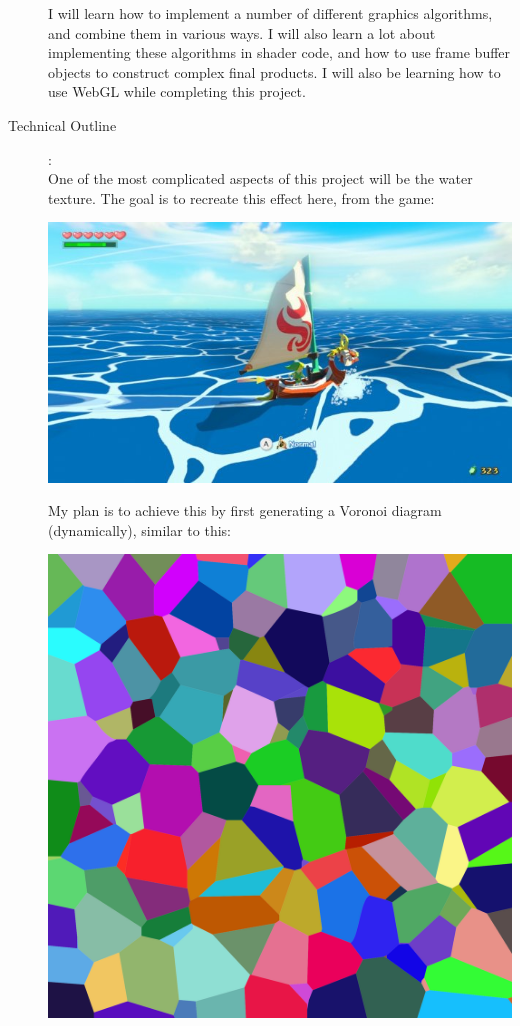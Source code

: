 \documentclass {article}
\begin{document}
\begin{description}
I will learn how to implement a number of different graphics algorithms, and combine them in various ways.  I will also learn a lot about implementing these algorithms in shader code, and how to use frame buffer objects to construct complex final products.  I will also be learning how to use WebGL while completing this project.

\item[Technical Outline]:\\

One of the most complicated aspects of this project will be the water texture.  The goal is to recreate this effect here, from the game:
	
\begin{center}
\includegraphics[scale=0.5]{windwaker}
\end{center}

\pagebreak

My plan is to achieve this by first generating a Voronoi diagram (dynamically),  similar to this:

\includegraphics[scale=0.06]{voronoi}


\end{description}
\end{document}
